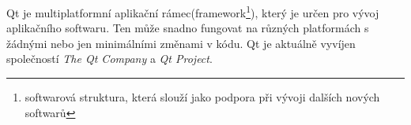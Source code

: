 Qt je multiplatformní aplikační rámec(framework\footnote{softwarová struktura, která slouží jako podpora při vývoji dalších nových softwarů}), který je určen pro vývoj aplikačního softwaru. Ten může snadno fungovat na různých platformách s žádnými nebo jen minimálními změnami v kódu. Qt je aktuálně vyvíjen společností \textit{The Qt Company} a \textit{Qt Project}.\cite{qt_wiki, qt}




